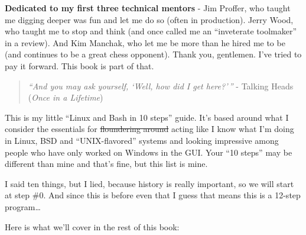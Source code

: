 \documentclass[10pt,]{book}
\numberwithin{figure}{chapter}
\begin{document}
\fi

\textbf{Dedicated to my first three technical mentors} - Jim Proffer,
who taught me digging deeper was fun and let me do so (often in
production). Jerry Wood, who taught me to stop and think (and once
called me an ``inveterate toolmaker'' in a review). And Kim Manchak, who
let me be more than he hired me to be (and continues to be a great chess
opponent). Thank you, gentlemen. I've tried to pay it forward. This book
is part of that.

\ifxetex\setcounter{chapter}{-2}\fi


\begin{quote}
\emph{``And you may ask yourself, `Well, how did I get here?'\,''} -
Talking Heads (\emph{Once in a Lifetime})
\end{quote}

This is my little ``Linux and Bash in 10 steps'' guide. It's based
around what I consider the essentials for \sout{floundering around}
acting like I know what I'm doing in Linux, BSD and ``UNIX-flavored''
systems and looking impressive among people who have only worked on
Windows in the GUI. Your ``10 steps'' may be different than mine and
that's fine, but this list is mine.

I said ten things, but I lied, because history is really important, so
we will start at step \#0. And since this is before even that I guess
that means this is a 12-step program\ldots{}

Here is what we'll cover in the rest of this book:
\end{document}
